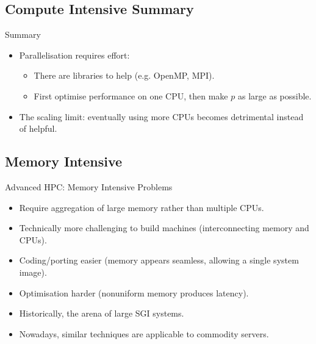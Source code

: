\subsection{Compute Intensive Summary}
\begin{frame}{Summary}
\begin{itemize}
\item{Parallelisation requires effort:}
\begin{itemize}
\item{There are libraries to help (e.g. \alert{OpenMP}, \alert{MPI}).}
\item{First optimise performance on one CPU, then make $p$ as large as possible.}
\end{itemize}
\pause
\item{The scaling limit: eventually using more CPUs becomes \alert{detrimental} instead of helpful.}
\end{itemize}
\end{frame}

\subsection{Memory Intensive}
\begin{frame}{Advanced HPC: Memory Intensive Problems}
\begin{itemize}
\item{Require aggregation of large memory rather than multiple CPUs.}
\pause
{}
\pause
\item{Technically more challenging to build machines (interconnecting memory \alert{and} CPUs).}
\pause
\item{Coding/porting easier (memory appears seamless, allowing a \alert{single system image}).}
\pause
\item{Optimisation harder (nonuniform memory produces latency).}
\pause
\item{Historically, the arena of large \alert{SGI} systems.}
\pause
\item{Nowadays, similar techniques are applicable to commodity servers.}
\end{itemize}
\end{frame}

